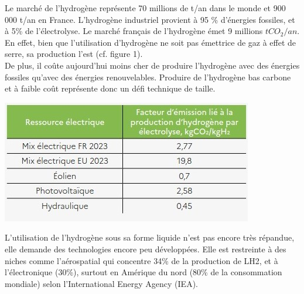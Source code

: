\documentclass[11pt,french,a4paper]{article}
\begin{document}
\begin{multicols}{2}

Le marché de l’hydrogène représente 70 millions de t/an dans le monde et 900 000 t/an en France. L’hydrogène industriel provient à 95 \% d’énergies fossiles, et à 5\% de l’électrolyse. Le marché français de l’hydrogène émet 9 millions $tCO_2/an$. En effet, bien que l’utilisation d’hydrogène ne soit pas émettrice de gaz à effet de serre, sa production l’est (cf. figure 1). \\

De plus, il coûte aujourd'hui moins cher de produire l’hydrogène avec des énergies fossiles qu’avec des énergies renouvelables. 
Produire de l'hydrogène bas carbone et à faible coût représente donc un défi technique de taille. 

\begin{center}
\includegraphics[width=1\linewidth]{image/chap1/facteur_emission_prod_H2_electrolyse.jpg}
\label{fig: 1}
\end{center}

\end{multicols}

L’utilisation de l’hydrogène sous sa forme liquide n’est pas encore très répandue, elle demande des technologies encore peu développées. Elle est restreinte à des niches comme l’aérospatial qui concentre 34\% de la production de LH2, et à l’électronique (30\%), surtout en Amérique du nord (80\% de la consommation mondiale) selon l'International Energy Agency (IEA). 
\end{document}
